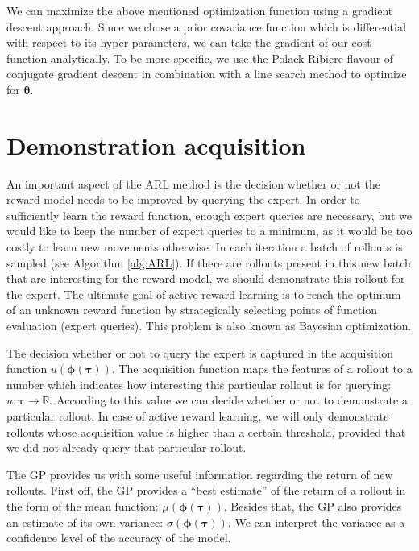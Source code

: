 \documentclass[mscThesis.tex]{subfiles}
\begin{document}
We can maximize the above mentioned optimization function using a gradient descent approach. Since we chose a prior covariance function which is differential with respect to its hyper parameters, we can take the gradient of our cost function analytically. To be more specific, we use the Polack-Ribiere flavour of conjugate gradient descent in combination with a line search method to optimize for $\bm{\theta}$.


\section{Demonstration acquisition}
\label{sec:acquisition}
An important aspect of the ARL method is the decision whether or not the reward model needs to be improved by querying the expert. In order to sufficiently learn the reward function, enough expert queries are necessary, but we would like to keep the number of expert queries to a minimum, as it would be too costly to learn new movements otherwise. In each iteration a batch of rollouts is sampled (see Algorithm \ref{alg:ARL}). If there are rollouts present in this new batch that are interesting for the reward model, we should demonstrate this rollout for the expert. The ultimate goal of active reward learning is to reach the optimum of an unknown reward function by strategically selecting points of function evaluation (expert queries). This problem is also known as Bayesian optimization. 

The decision whether or not to query the expert is captured in the acquisition function $u( \bm{\phi} (\bm{\tau}))$. The acquisition function maps the features of a rollout to a number which indicates how interesting this particular rollout is for querying: $u: \bm{\tau} \rightarrow \mathbb{R}$. According to this value we can decide whether or not to demonstrate a particular rollout. In case of active reward learning, we will only demonstrate rollouts whose acquisition value is higher than a certain threshold, provided that we did not already query that particular rollout. 

The GP provides us with some useful information regarding the return of new rollouts. First off, the GP provides a ``best estimate'' of the return of a rollout in the form of the mean function: $\mu(\bm{\phi}(\bm{\tau}))$. Besides that, the GP also provides an estimate of its own variance: $\sigma (\bm{\phi}(\bm{\tau}))$. We can interpret the variance as a confidence level of the accuracy of the model.  
\end{document}
